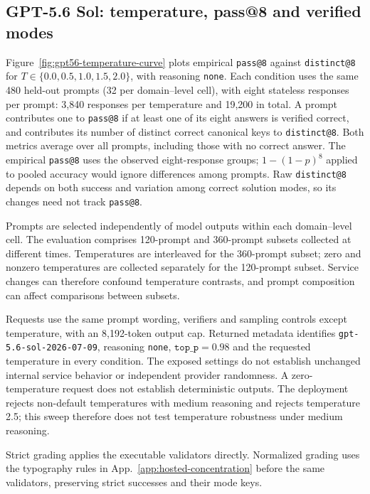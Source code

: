 \subsection{GPT-5.6 Sol: temperature, pass@8 and verified modes}
\label{app:gpt56-temperature}
Figure~\ref{fig:gpt56-temperature-curve} plots empirical \texttt{pass@8}
against \texttt{distinct@8} for $T\in\{0.0,0.5,1.0,1.5,2.0\}$, with reasoning
\texttt{none}. Each condition uses the same 480 held-out prompts
(32 per domain--level cell), with eight stateless responses per prompt:
3,840 responses per temperature and 19,200 in total. A prompt contributes one
to \texttt{pass@8} if at least one of its eight answers is verified correct,
and contributes its number of distinct correct canonical keys to \texttt{distinct@8}.
Both metrics average over all prompts, including those with no correct answer.
The empirical \texttt{pass@8} uses the observed eight-response groups;
$1-(1-p)^8$ applied to pooled accuracy would ignore differences among prompts.
Raw \texttt{distinct@8} depends on both success and variation among correct
solution modes, so its changes need not track \texttt{pass@8}.

Prompts are selected independently of model outputs within each
domain--level cell. The evaluation comprises 120-prompt and 360-prompt
subsets collected at different times. Temperatures are interleaved for the
360-prompt subset; zero and nonzero temperatures are collected separately
for the 120-prompt subset. Service changes can therefore confound temperature
contrasts, and prompt composition can affect comparisons between subsets.

Requests use the same prompt wording, verifiers and sampling controls
except temperature, with an 8,192-token output cap. Returned metadata
identifies \texttt{gpt-5.6-sol-2026-07-09}, reasoning \texttt{none},
$\texttt{top\_p}=0.98$ and the requested temperature in every condition.
The exposed settings do not establish unchanged internal service behavior
or independent provider randomness. A zero-temperature request does not
establish deterministic outputs. The deployment rejects non-default
temperatures with medium reasoning and rejects temperature 2.5; this
sweep therefore does not test temperature robustness under medium reasoning.

Strict grading applies the executable validators directly. Normalized
grading uses the typography rules in App.~\ref{app:hosted-concentration}
before the same validators, preserving strict successes and their mode keys.

